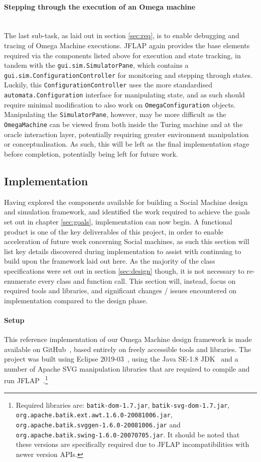 \documentclass[12pt]{article}
\begin{document}
		\paragraph{Stepping through the execution of an Omega machine}\hfill\\
			The last sub-task, as laid out in section \ref{sec:req}, is to enable debugging and tracing of Omega Machine executions.
			JFLAP again provides the base elements required via the components listed above for execution and state tracking, in tandem with the \texttt{gui.sim.SimulatorPane}, which contains a \texttt{gui.sim.ConfigurationController} for monitoring and stepping through states.
			Luckily, this \texttt{ConfigurationController} uses the more standardised \texttt{automata.Configuration} interface for manipulating state, and as such should require minimal modification to also work on \texttt{OmegaConfiguration} objects.
			Manipulating the \texttt{SimulatorPane}, however, may be more difficult as the \texttt{OmegaMachine} can be viewed from both inside the Turing machine and at the oracle interaction layer, potentially requiring greater environment manipulation or conceptualisation.
			As such, this will be left as the final implementation stage before completion, potentially being left for future work.
	\subsection{Implementation}
	\label{sec:impl}
			Having explored the components available for building a Social Machine design and simulation framework, and identified the work required to achieve the goals set out in chapter \ref{sec:goals}, implementation can now begin.
			A functional product is one of the key deliverables of this project, in order to enable acceleration of future work concerning Social machines, as such this section will list key details discovered during implementation to assist with continuing to build upon the framework laid out here.
			As the majority of the class specifications were set out in section \ref{sec:design} though, it is not necessary to re-enumerate every class and function call.
			This section will, instead, focus on required tools and libraries, and significant changes / issues encountered on implementation compared to the design phase.
		\paragraph{Setup}
			This reference implementation of our Omega Machine design framework is made available on GitHub~\cite{AnnaKutsevaGitHub}, based entirely on freely accessible tools and libraries.
			The project was built using Eclipse 2019-03~\cite{eclipse_2019}, using the Java SE-1.8 JDK~\cite{java_8} and a number of Apache SVG manipulation libraries that are required to compile and run JFLAP~\cite{maven}.\footnote{Required libraries are: \texttt{batik-dom-1.7.jar}, \texttt{batik-svg-dom-1.7.jar}, \texttt{org.apache.batik.ext.awt.1.6.0-20081006.jar}, \texttt{org.apache.batik.svggen-1.6.0-20081006.jar} and \texttt{org.apache.batik.swing-1.6.0-20070705.jar}.
			It should be noted that these versions are specifically required due to JFLAP incompatibilities with newer version APIs.}
\end{document}
